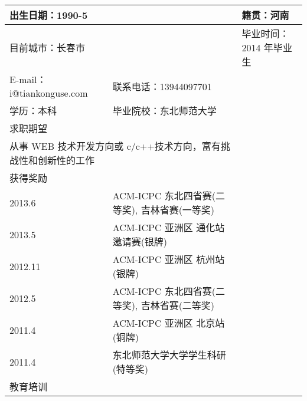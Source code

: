 \documentclass[a4paper]{article}
\begin{document}
\begin{CJK*}{UTF8}{gbsn}



\begin{flushleft} 



\begin{table}[h]
\begin{tabular}{p{4cm}p{4cm}p{4cm}p{4cm}}

\hline \multicolumn{2}{l}{出生日期：1990-5} & \multicolumn{2}{l}{籍贯：河南}\\


\hline \multicolumn{2}{l}{目前城市：长春市} & \multicolumn{2}{l}{毕业时间：2014 年毕业生}\\

\hline
E-mail：i@tiankonguse.com & 联系电话：13944097701 \\

\hline
学历：本科 & 毕业院校：东北师范大学 \\

\hline\multicolumn{2}{l}{求职期望 }\\

\hline
\multicolumn{2}{p{16cm}}{从事 WEB 技术开发方向或 c/c++技术方向，富有挑战性和创新性的工作}\\

\hline\multicolumn{2}{p{16cm}}{获得奖励 }\\
\hline 2013.6  & ACM-ICPC 东北四省赛(二等奖), 吉林省赛(一等奖) \\
\hline 2013.5  & ACM-ICPC 亚洲区 通化站邀请赛(银牌) \\
\hline 2012.11 & ACM-ICPC 亚洲区 杭州站(银牌) \\
\hline 2012.5  & ACM-ICPC 东北四省赛(二等奖), 吉林省赛(二等奖) \\
\hline 2011.4  & ACM-ICPC 亚洲区 北京站(铜牌) \\
\hline 2011.4  & 东北师范大学大学学生科研(特等奖) \\

\hline\multicolumn{2}{p{16cm}}{教育培训 }\\

\hline




\end{tabular}
\end{table}

\fontsize{10pt}{\baselineskip}\selectfont {

	



}

\end{flushleft}
\end{CJK*}
\end{document}
